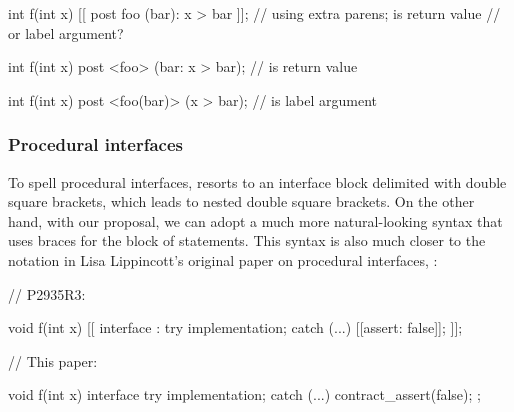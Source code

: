 \begin{minipage}[t]{8cm}
\begin{codeblock}
int f(int x)
  [[ post foo (bar): x > bar ]];  
  // using extra parens; is  return value
  // or label argument?
\end{codeblock}
\end{minipage}
\begin{minipage}[t]{8cm}
\begin{codeblock}
int f(int x)
  post <foo> (bar: x > bar); 
  //   is return value

int f(int x)
  post <foo(bar)> (x > bar);
  //  is label argument
\end{codeblock}
\end{minipage}

\subsubsection{Procedural interfaces}
\label{subsubsec:comp_interfaces}

To spell procedural interfaces, \cite{P2935R3} resorts to an interface block delimited with double square brackets, which leads to nested double square brackets. On the other hand, with our proposal, we can adopt a much more natural-looking syntax that uses braces for the block of statements. This syntax is also much closer to the notation in Lisa Lippincott's original paper on procedural interfaces, \cite{P0465R0}:

\begin{minipage}{8cm}
\begin{codeblock}
// P2935R3:

void f(int x)
  [[ interface :
    try {
      implementation;
    }
    catch (...) {
      [[assert: false]];
    }
  ]];
\end{codeblock}
\end{minipage}
\begin{minipage}{8cm}
\begin{codeblock}
// This paper:

void f(int x)
interface {
  try {
    implementation;
  }
  catch (...) {
    contract_assert(false);
  }
};
\end{codeblock}
\end{minipage}



